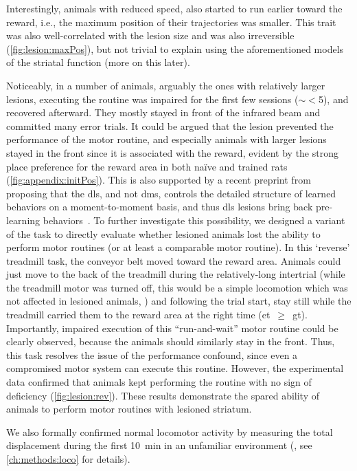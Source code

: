 Interestingly, animals with reduced speed, also started to run earlier toward the reward, i.e., the maximum position of their trajectories was smaller.
This trait was also well-correlated with the lesion size and was also irreversible (\autoref{fig:lesion:maxPos}), but not trivial to explain using the aforementioned models of the striatal function (more on this later).
\par
Noticeably, in a number of animals, arguably the ones with relatively larger lesions, executing the routine was impaired for the first few sessions ($\sim<$5), and recovered afterward.
They mostly stayed in front of the infrared beam and committed many error trials.
It could be argued that the lesion prevented the performance of the motor routine, and especially animals with larger lesions stayed in the front since it is associated with the reward, evident by the strong place preference for the reward area in both na\"{i}ve and trained rats (\autoref{fig:appendix:initPos}).
This is also supported by a recent preprint from \citeauthor{Dhawale2019} proposing that the \gls{dls}, and not \gls{dms}, controls the detailed structure of learned behaviors on a moment-to-moment basis, and thus \gls{dls} lesions bring back pre-learning behaviors~\cite{Dhawale2019}.
To further investigate this possibility, we designed a variant of the task to directly evaluate whether lesioned animals lost the ability to perform motor routines (or at least a comparable motor routine).
In this `reverse' treadmill task, the conveyor belt moved toward the reward area.
Animals could just move to the back of the treadmill during the relatively-long intertrial (while the treadmill motor was turned off, this would be a simple locomotion which was not affected in lesioned animals, ) and following the trial start, stay still while the treadmill carried them to the reward area at the right time (\gls{et}~$\geq$~\gls{gt}).
Importantly, impaired execution of this ``run-and-wait'' motor routine could be clearly observed, because the animals should similarly stay in the front.
Thus, this task resolves the issue of the performance confound, since even a compromised motor system can execute this routine.
However, the experimental data confirmed that animals kept performing the routine with no sign of deficiency (\autoref{fig:lesion:rev}).
These results demonstrate the spared ability of animals to perform motor routines with lesioned striatum.
\par
We also formally confirmed normal locomotor activity by measuring the total displacement during the first 10~min in an unfamiliar environment (, see \autoref{ch:methods:loco} for details).
